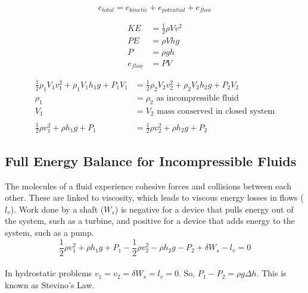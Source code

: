 \documentclass[12pt,a4paper]{article}
\begin{document}
        \[e_{total}=e_{kinetic}+e_{potential}+e_{flow}\]

        \begin{align*}
            KE&=\frac{1}{2}\rho Vv^2 \\
            PE&=\rho Vhg \\
            P&=\rho gh \\
            e_{flow}&=PV
        \end{align*}

        \begin{align*}
            \frac{1}{2}\rho_1 V_1 v_1^2+\rho_1V_1h_1g+P_1V_1&=\frac{1}{2}\rho_2V_2v^2_2+\rho_2V_2h_2g+P_2V_2 \\
            \rho_1 &= \rho_2 \text{ as incompressible fluid} \\
            V_1&=V_2 \text{ mass conserved in closed system} \\
            & \\
            \frac{1}{2}\rho v^2_1+\rho h_1g+P_1&=\frac{1}{2}\rho v^2_2+\rho h_2g+P_2
        \end{align*}

    \subsection{Full Energy Balance for Incompressible Fluids}
        The molecules of a fluid experience cohesive forces and collisions between each other. These are linked to viscosity, which leads to viscous energy losses in flows ($l_v$). Work done by a shaft ($W_s$) is negative for a device that pulls energy out of the system, such as a turbine, and positive for a device that adds energy to the system, such as a pump.
        \[\frac{1}{2}\rho v^2_1+\rho h_1g+P_1-\frac{1}{2}\rho v^2_2-\rho h_2g-P_2+\delta W_s-l_v=0\]
        \\
        In hydrostatic problems $v_1=v_2=\delta W_s=l_v=0$. So, $P_1-P_2=\rho g\Delta h$. This is known as Stevino's Law.

\newpage
\end{document}
